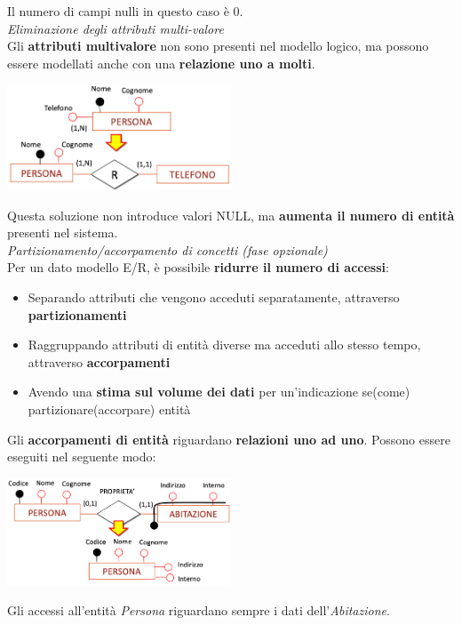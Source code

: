 \documentclass{article}
\begin{document}
Il numero di campi nulli in questo caso è 0.\vspace{14pt}\\
\textit{Eliminazione degli attributi multi-valore}\\
Gli \textbf{attributi multivalore} non sono presenti nel modello logico, ma possono essere modellati anche con una \textbf{relazione uno a molti}.
\begin{center}
    \includegraphics[width=0.5\textwidth]{foto 4.png}
\end{center}
Questa soluzione non introduce valori NULL, ma \textbf{aumenta il numero di entità} presenti nel sistema.\vspace{70pt}\\
\textit{Partizionamento/accorpamento di concetti (fase opzionale)}\\
Per un dato modello E/R, è possibile \textbf{ridurre il numero di accessi}:
\begin{itemize}[label={-}, leftmargin=1cm]
    \itemsep0em
    \item Separando attributi che vengono acceduti separatamente, attraverso \textbf{partizionamenti}
    \item Raggruppando attributi di entità diverse ma acceduti allo stesso tempo, attraverso \textbf{accorpamenti}
    \item Avendo una \textbf{stima sul volume dei dati} per un'indicazione se(come) partizionare(accorpare) entità\\
\end{itemize}
Gli \textbf{accorpamenti di entità} riguardano \textbf{relazioni uno ad uno}. Possono essere eseguiti nel seguente modo:
\begin{center}
    \includegraphics[width=0.5\textwidth]{foto 5.png}
\end{center}
Gli accessi all'entità \textit{Persona} riguardano sempre i dati dell'\textit{Abitazione}.\\
\end{document}
